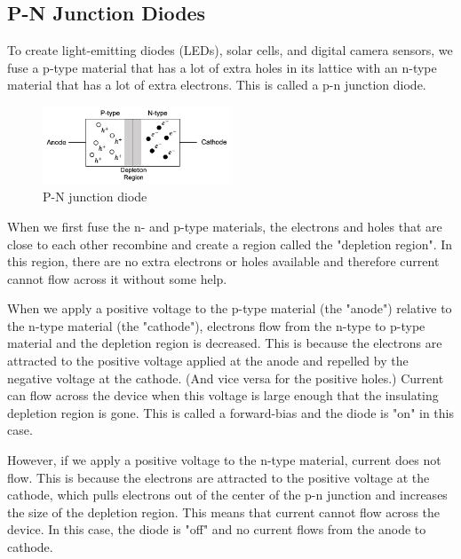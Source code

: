 \subsection{P-N Junction Diodes}

To create light-emitting diodes (LEDs), solar cells, and digital camera sensors, we fuse a p-type material that has a lot of extra holes in its lattice with an n-type material that has a lot of extra electrons. This is called a p-n junction diode. 

	\begin{figure}[H]{
		\centering
		\includegraphics[width=0.5\textwidth]{n_led/pn_junction.png}
		\caption{P-N junction diode}
		\vspace{-5mm}}
	\label{fig:BandDiagramPhoton}
\end{figure}

When we first fuse the n- and p-type materials, the electrons and holes that are close to each other recombine and create a region called the "depletion region". In this region, there are no extra electrons or holes available and therefore current cannot flow across it without some help. 

When we apply a positive voltage to the p-type material (the "anode") relative to the n-type material (the "cathode"), electrons flow from the n-type to p-type material and the depletion region is decreased. This is because the electrons are attracted to the positive voltage applied at the anode and repelled by the negative voltage at the cathode. (And vice versa for the positive holes.) Current can flow across the device when this voltage is large enough that the insulating depletion region is gone. This is called a forward-bias and the diode is "on" in this case. 

However, if we apply a positive voltage to the n-type material, current does not flow. This is because the electrons are attracted to the positive voltage at the cathode, which pulls electrons out of the center of the p-n junction and increases the size of the depletion region. This means that current cannot flow across the device. In this case, the diode is "off" and no current flows from the anode to cathode.

